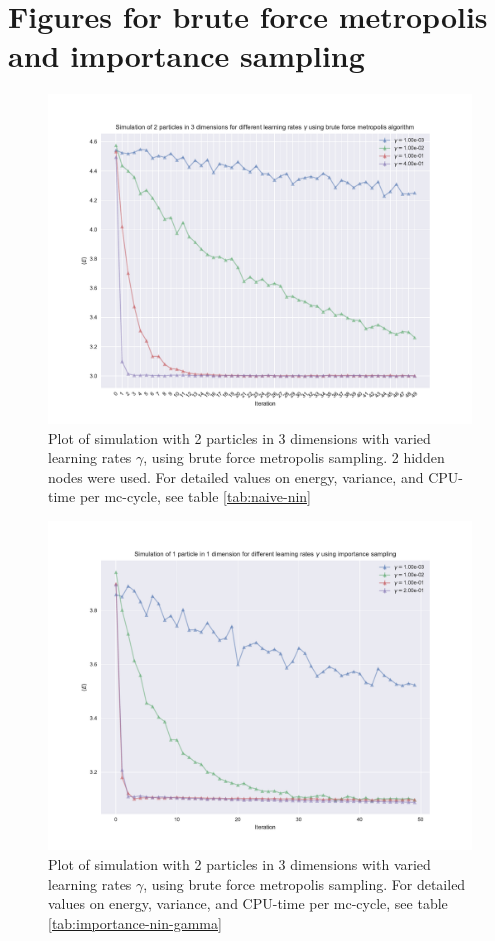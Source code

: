 \section{Figures for brute force metropolis and importance sampling}
\begin{figure}[h]
\hspace{-2.8cm}
\includegraphics[width = \paperwidth]{figures/naive_2p_3d.pdf}
\caption{Plot of simulation with 2 particles in 3 dimensions with varied learning rates $\gamma$, using brute force metropolis sampling.
			2 hidden nodes were used.
			For detailed values on energy, variance, and CPU-time per mc-cycle, see table \ref{tab:naive-nin}}
\label{fig:naive-nin}
\end{figure}


\begin{figure}[h]
\hspace{-2.8cm}
\includegraphics[width = \paperwidth]{figures/importance_2p_3d.pdf}
\caption{Plot of simulation with 2 particles in 3 dimensions with varied learning rates $\gamma$, using brute force metropolis sampling.
			For detailed values on energy, variance, and CPU-time per mc-cycle, see table \ref{tab:importance-nin-gamma}}
\label{fig:importance-nin-gamma}
\end{figure}


